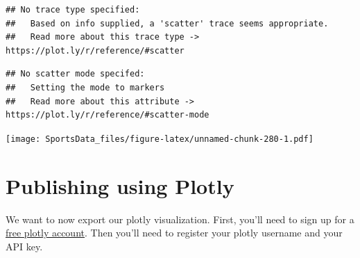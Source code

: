 \documentclass[]{book}
\newenvironment{Shaded}{\begin{snugshade}}{\end{snugshade}}
\newcommand{\DataTypeTok}[1]{\textcolor[rgb]{0.13,0.29,0.53}{#1}}
\newcommand{\KeywordTok}[1]{\textcolor[rgb]{0.13,0.29,0.53}{\textbf{#1}}}
\newcommand{\NormalTok}[1]{#1}
\newcommand{\OperatorTok}[1]{\textcolor[rgb]{0.81,0.36,0.00}{\textbf{#1}}}
\newcommand{\StringTok}[1]{\textcolor[rgb]{0.31,0.60,0.02}{#1}}
\begin{document}
\begin{Shaded}
\end{Shaded}

\begin{verbatim}
## No trace type specified:
##   Based on info supplied, a 'scatter' trace seems appropriate.
##   Read more about this trace type -> https://plot.ly/r/reference/#scatter
\end{verbatim}

\begin{verbatim}
## No scatter mode specifed:
##   Setting the mode to markers
##   Read more about this attribute -> https://plot.ly/r/reference/#scatter-mode
\end{verbatim}

\texttt{[image: SportsData\_files/figure-latex/unnamed-chunk-280-1.pdf]}

\hypertarget{publishing-using-plotly}{%
\section{Publishing using Plotly}\label{publishing-using-plotly}}

We want to now export our plotly visualization. First, you'll need to sign up for a \href{https://chart-studio.plotly.com/Auth/login/\#/}{free plotly account}. Then you'll need to register your plotly username and your API key.
\end{document}
